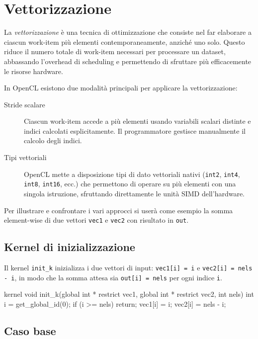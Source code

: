 \section{Vettorizzazione}

La \emph{vettorizzazione} è una tecnica di ottimizzazione che consiste nel far elaborare a ciascun work-item più elementi contemporaneamente, anziché uno solo. Questo riduce il numero totale di work-item necessari per processare un dataset, abbassando l'overhead di scheduling e permettendo di sfruttare più efficacemente le risorse hardware.

In OpenCL esistono due modalità principali per applicare la vettorizzazione:
\begin{description}
    \item[Stride scalare] Ciascun work-item accede a più elementi usando variabili scalari distinte e indici calcolati esplicitamente. Il programmatore gestisce manualmente il calcolo degli indici.
    \item[Tipi vettoriali] OpenCL mette a disposizione tipi di dato vettoriali nativi (\texttt{int2}, \texttt{int4}, \texttt{int8}, \texttt{int16}, ecc.) che permettono di operare su più elementi con una singola istruzione, sfruttando direttamente le unità SIMD dell'hardware.
\end{description}

\noindent
Per illustrare e confrontare i vari approcci si userà come esempio la somma element-wise di due vettori \texttt{vec1} e \texttt{vec2} con risultato in \texttt{out}.

\subsection{Kernel di inizializzazione}

Il kernel \texttt{init\_k} inizializza i due vettori di input: \texttt{vec1[i] = i} e \texttt{vec2[i] = nels - i}, in modo che la somma attesa sia \texttt{out[i] = nels} per ogni indice \texttt{i}.

\begin{code}[caption={Kernel di inizializzazione dei vettori di input}, label={code:vecsum_init}]
kernel void init_k(global int * restrict vec1,
                   global int * restrict vec2, int nels)
{
    int i = get_global_id(0);
    if (i >= nels) return;
    vec1[i] = i;
    vec2[i] = nels - i;
}
\end{code}

\subsection{Caso base}


